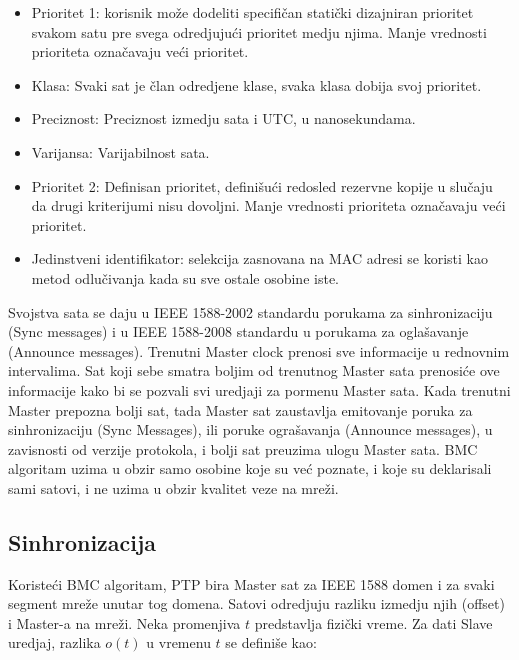 \documentclass[a4paper,12pt, master]{etf}
\begin{document}
        \begin{itemize}
            \item Prioritet 1: korisnik mo\v{z}e dodeliti specifi\v{c}an stati\v{c}ki dizajniran prioritet
            svakom satu pre	svega odredjuju\'{c}i prioritet medju njima. Manje vrednosti prioriteta
            ozna\v{c}avaju ve\'{c}i prioritet.
                \item Klasa: Svaki sat je \v{c}lan odredjene klase, svaka klasa dobija svoj prioritet.
                \item Preciznost: Preciznost izmedju sata i UTC, u nanosekundama.
                \item Varijansa: Varijabilnost sata.
            \item Prioritet 2: Definisan prioritet, defini\v{s}u\'{c}i redosled rezervne kopije u slu\v{c}aju
            da drugi kriterijumi nisu dovoljni. Manje vrednosti prioriteta ozna\v{c}avaju ve\'{c}i prioritet.
                \item Jedinstveni identifikator: selekcija zasnovana na MAC adresi se koristi kao metod
                odlu\v{c}ivanja	kada su sve ostale osobine iste.
        \end{itemize}

        Svojstva sata se daju u IEEE 1588-2002 standardu porukama za sinhronizaciju (Sync messages) i u
        IEEE 1588-2008 standardu u porukama za ogla\v{s}avanje (Announce messages). Trenutni Master clock
	prenosi sve informacije u rednovnim intervalima. Sat koji sebe smatra boljim od trenutnog Master
        sata prenosi\'{c}e ove informacije kako bi se pozvali svi uredjaji za
        pormenu Master sata. Kada trenutni Master prepozna bolji sat, tada Master sat
	zaustavlja emitovanje poruka za sinhronizaciju (Sync Messages), ili poruke ogra\v{s}avanja
	(Announce messages), u zavisnosti od verzije protokola, i bolji sat preuzima ulogu Master
	sata. BMC algoritam uzima u obzir samo osobine koje su ve\'{c} poznate, i koje su deklarisali
	sami satovi, i ne uzima u obzir kvalitet veze na mre\v{z}i.

	\subsection{Sinhronizacija}

	Koriste\'{c}i BMC algoritam, PTP bira Master sat za IEEE 1588 domen i za svaki segment mre\v{z}e
        unutar tog domena. Satovi odredjuju razliku izmedju njih (offset) i Master-a na mre\v{z}i. Neka
        promenjiva $t$ predstavlja fizi\v{c}ki vreme. Za dati Slave uredjaj, razlika $o(t)$ u vremenu $t$
        se defini\v{s}e kao:
\end{document}
